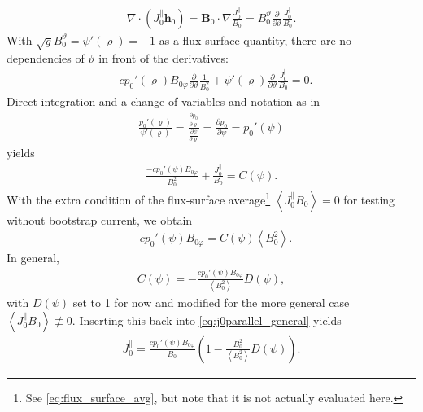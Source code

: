 \documentclass[a4paper, twoside, 10pt, english]{article}
\numberwithin{equation}{section}
\let\temp\varrho
\let\varrho\rho
\let\rho\temp
\let\temp\vartheta
\let\vartheta\theta
\let\theta\temp
\let\temp\varphi
\let\varphi\phi
\let\phi\temp
\let\vec\symbf
\newcommand*\grad{\ensuremath{\nabla}}
\newcommand*\divg{\ensuremath{\nabla \cdot}}
\newcommand*\pd[2][]{\ensuremath{\frac{\partial #1}{\partial #2}}}  %
\begin{document}
\begin{gather}
  \divg(J_{0}^{\parallel} \vec{h}_{0}) = \vec{B}_{0} \cdot \grad \frac{J_{0}^{\parallel}}{B_{0}} = B_{0}^{\theta} \pd{\theta} \frac{J_{0}^{\parallel}}{B_{0}}.
\end{gather}
With $\sqrt{g} B_{0}^{\theta} = \psi'(\rho) = -1$ as a flux surface quantity, there are no dependencies of $\theta$ in front of the derivatives:
\begin{gather}
  -c p_{0}' (\rho) B_{0 \phi} \pd{\theta} \frac{1}{B_{0}^{2}} + \psi'(\rho) \pd{\theta} \frac{J_{0}^{\parallel}}{B_{0}} = 0.
\end{gather}
Direct integration and a change of variables and notation as in
\begin{gather}
  \frac{p_{0}'(\rho)}{\psi'(\rho)} = \frac{\pd[p_{0}]{\rho}}{\pd[\psi]{\rho}} = \pd[p_{0}]{\psi} = p_{0}'(\psi)
\end{gather}
yields
\begin{gather}
  \frac{-c p_{0}' (\psi) B_{0 \phi}}{B_{0}^{2}} + \frac{J_{0}^{\parallel}}{B_{0}} = C(\psi). \label{eq:j0parallel_general}
\end{gather}
With the extra condition of the flux-surface average\footnote{See \cref{eq:flux_surface_avg}, but note that it is not actually evaluated here.} $\left\langle J_{0}^{\parallel} B_{0} \right\rangle = 0$ for testing without bootstrap current, we obtain
\begin{gather}
  -c p_{0}'(\psi) B_{0 \phi} = C(\psi) \left\langle B_{0}^{2} \right\rangle.
\end{gather}
In general, 
\begin{gather}
  C(\psi) = -\frac{c p_{0}'(\psi) B_{0 \phi}}{\left\langle B_{0}^{2} \right\rangle} D(\psi),
\end{gather}
with $D(\psi)$ set to 1 for now and modified for the more general case $\left\langle J_{0}^{\parallel} B_{0} \right\rangle \not\equiv 0$. Inserting this back into \cref{eq:j0parallel_general} yields
\begin{gather}
  J_{0}^{\parallel} = \frac{c p_{0}'(\psi) B_{0 \phi}}{B_{0}} \left( 1 - \frac{B_{0}^{2}}{\left\langle B_{0}^{2} \right\rangle} D(\psi) \right).
\end{gather}
\end{document}
